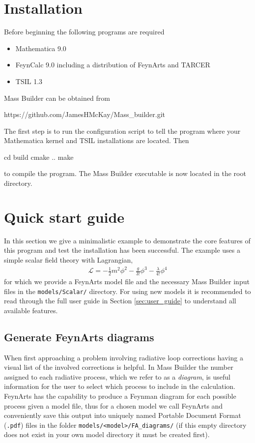 \section{Installation}

Before beginning the following programs are required
\begin{itemize}
\item Mathematica 9.0
\item FeynCalc 9.0 including a distribution of FeynArts and TARCER
\item TSIL 1.3
\end{itemize}
Mass Builder can be obtained from

\begin{lstterm}
https://github.com/JamesHMcKay/Mass_builder.git
\end{lstterm}

The first step is to run the configuration script to tell the program where your Mathematica kernel and TSIL installations are located.  Then 
\begin{lstterm}
cd build
cmake ..
make
\end{lstterm}
to compile the program.  The Mass Builder executable is now located in the root directory.

\section{Quick start guide}

In this section we give a minimalistic example to demonstrate the core features of this program and test the installation has been successful.  The example uses a simple scalar field theory with Lagrangian,
\begin{align}
\mathcal{L} = -\frac{1}{2}m^2\phi^2 - \frac{g}{3!}\phi^3-\frac{\lambda}{4!}\phi^4
\end{align}
for which we provide a FeynArts model file and the necessary Mass Builder input files in the \lstinline{models/Scalar/} directory.  For using new models it is recommended to read through the full user guide in Section \ref{sec:user_guide} to understand all available features.

\subsection{Generate FeynArts diagrams}\label{generate_diagrams}

When first approaching a problem involving radiative loop corrections having a visual list of the involved corrections is helpful.  In Mass Builder the number assigned to each radiative process, which we refer to as a \textit{diagram}, is useful information for the user to select which process to include in the calculation.  FeynArts has the capability to produce a Feynman diagram for each possible process given a model file, thus for a chosen model we call FeynArts and conveniently save this output into uniquely named Portable Document Format (\lstinline{.pdf}) files in the folder \lstinline{models/<model>/FA_diagrams/} (if this empty directory does not exist in your own model directory it must be created first).

